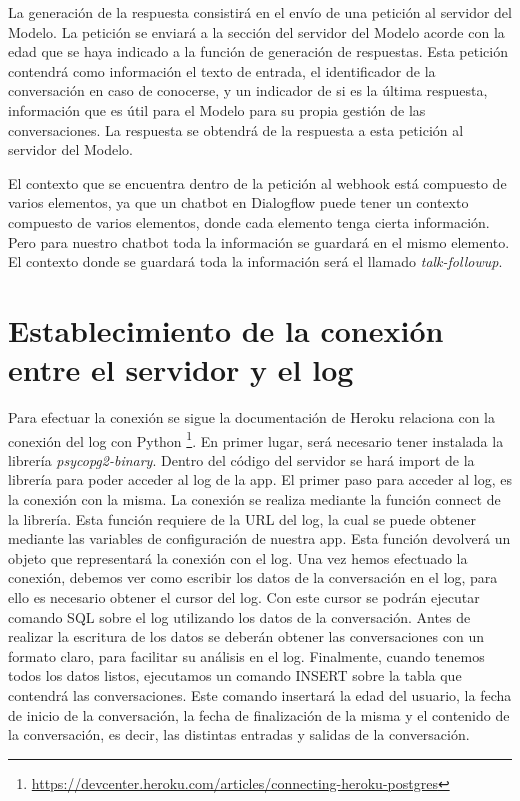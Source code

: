 La generación de la respuesta consistirá en el envío de una petición al servidor del Modelo. La petición se enviará a la sección del servidor del Modelo acorde con la edad que se haya indicado a la función de generación de respuestas. Esta petición contendrá como información el texto de entrada, el identificador de la conversación en caso de conocerse, y un indicador de si es la última respuesta, información que es útil para el Modelo para su propia gestión de las conversaciones. La respuesta se obtendrá de la respuesta a esta petición al servidor del Modelo.

El contexto que se encuentra dentro de la petición al webhook está compuesto de varios elementos, ya que un chatbot en Dialogflow puede tener un contexto compuesto de varios elementos, donde cada elemento tenga cierta información. Pero para nuestro chatbot toda la información se guardará en el mismo elemento. El contexto donde se guardará toda la información será el llamado \textit{talk-followup}.


\section{Establecimiento de la conexión entre el servidor y el log} \label{sec:conexion_server_log}

Para efectuar la conexión se sigue la documentación de Heroku relaciona con la conexión del log con Python \footnote{\href{https://devcenter.heroku.com/articles/connecting-heroku-postgres#connecting-in-python}{https://devcenter.heroku.com/articles/connecting-heroku-postgres}}. En primer lugar, será necesario tener instalada la librería \textit{psycopg2-binary}. Dentro del código del servidor se hará import de la librería para poder acceder al log de la app. El primer paso para acceder al log, es la conexión con la misma. La conexión se realiza mediante la función connect de la librería. Esta función requiere de la URL del log, la cual se puede obtener mediante las variables de configuración de nuestra app. Esta función devolverá un objeto que representará la conexión con el log. Una vez hemos efectuado la conexión, debemos ver como escribir los datos de la conversación en el log, para ello es necesario obtener el cursor del log. Con este cursor se podrán ejecutar comando SQL sobre el log utilizando los datos de la conversación. Antes de realizar la escritura de los datos se deberán obtener las conversaciones con un formato claro, para facilitar su análisis en el log. Finalmente, cuando tenemos todos los datos listos, ejecutamos un comando INSERT sobre la tabla que contendrá las conversaciones. Este comando insertará la edad del usuario, la fecha de inicio de la conversación, la fecha de finalización de la misma y el contenido de la conversación, es decir, las distintas entradas y salidas de la conversación.

